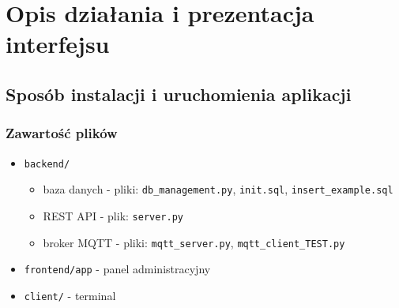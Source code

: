 \section{Opis działania i prezentacja interfejsu}
\subsection{Sposób instalacji i uruchomienia aplikacji}
\subsubsection{Zawartość plików}
\begin{itemize}
  \item{
    \verb|backend/|
    \begin{itemize}
      \item{baza danych - pliki: \verb|db_management.py|, \verb|init.sql|, \verb|insert_example.sql|}
      \item{REST API - plik: \verb|server.py|}
      \item{broker MQTT - pliki: \verb|mqtt_server.py|, \verb|mqtt_client_TEST.py|}
    \end{itemize}
  }
  \item{\verb|frontend/app| - panel administracyjny}
  \item{\verb|client/| - terminal}
\end{itemize}
